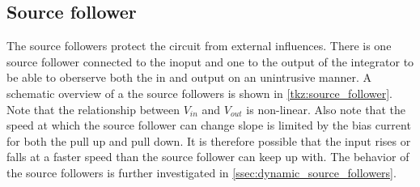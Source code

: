 \subsection{Source follower}\label{ssec:source_follower}
The source followers protect the circuit from external influences. There is one source follower connected to the inoput and one to the output of the integrator to be able to oberserve both the in and output on an unintrusive manner. A schematic overview of a the source followers is shown in \cref{tkz:source_follower}. Note that the relationship between $V_{in}$ and $V_{out}$ is non-linear. Also note that the speed at which the source follower can change slope is limited by the bias current for both the pull up and pull down. It is therefore possible that the input rises or falls at a faster speed than the source follower can keep up with. The behavior of the source followers is further investigated in \cref{ssec:dynamic_source_followers}. 



